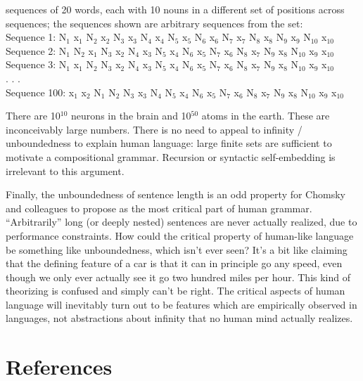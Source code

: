 \documentclass{article}
\begin{document}
\begin{myexample}
\label{ex1}
 sequences of 20 words, each with 10 nouns in a different set of positions across sequences; the sequences shown are arbitrary sequences from the set:\\
Sequence 1: N$_1$ x$_1$ N$_2$ x$_2$ N$_3$ x$_3$ N$_4$ x$_4$ N$_5$ x$_5$ N$_6$ x$_6$ N$_7$ x$_7$ N$_8$ x$_8$ N$_9$ x$_9$ N$_{10}$ x$_{10}$\\
Sequence 2: N$_1$ N$_2$ x$_1$ N$_3$ x$_2$ N$_4$ x$_3$ N$_5$ x$_4$ N$_6$ x$_5$ N$_7$ x$_6$ N$_8$ x$_7$ N$_9$ x$_8$ N$_{10}$ x$_9$ x$_{10}$\\
Sequence 3: N$_1$ x$_1$ N$_2$ N$_3$ x$_2$ N$_4$ x$_3$ N$_5$ x$_4$ N$_6$ x$_5$ N$_7$ x$_6$ N$_8$ x$_7$ N$_9$ x$_8$ N$_{10}$ x$_9$ x$_{10}$\\
. . .\\
Sequence 100: x$_1$ x$_2$ N$_1$ N$_2$ N$_3$ x$_3$ N$_4$ N$_5$ x$_4$ N$_6$ x$_5$ N$_7$ x$_6$ N$_8$ x$_7$ N$_9$ x$_8$ N$_{10}$ x$_9$ x$_{10}$
\end{myexample}

There are 10$^{10}$ neurons in the brain and 10$^{50}$ atoms in the earth. These are inconceivably large numbers. There is no need to appeal to infinity / unboundedness to explain human language: large finite sets are sufficient to motivate a compositional grammar. Recursion or syntactic self-embedding is irrelevant to this argument.

Finally, the unboundedness of sentence length is an odd property for Chomsky and colleagues to propose as the most critical part of human grammar.  ``Arbitrarily'' long (or deeply nested) sentences are never actually realized, due to performance constraints. How could the critical property of human-like language be something like unboundedness, which isn’t ever seen? It's a bit like claiming that the defining feature of a car is that it can in principle go any speed, even though we only ever actually see it go two hundred miles per hour. This kind of theorizing is confused and simply can't be right. The critical aspects of human language will inevitably turn out to be features which are empirically observed in languages, not abstractions about infinity that no human mind actually realizes.

\newpage

\section{References}


\end{document}
